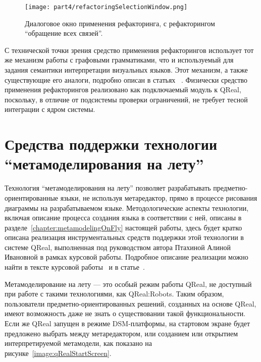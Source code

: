 \begin{figure} [ht]
	\begin{center}
		\texttt{[image: part4/refactoringSelectionWindow.png]}
		\caption{Диалоговое окно применения рефакторинга, с рефакторингом "`обращение всех связей"'.}
		\label{image:refactoringSelectionWindow}
	\end{center}
\end{figure}

С технической точки зрения средство применения рефакторингов использует тот же механизм 
работы с графовыми грамматиками, что и используемый для задания семантики интерпретации 
визуальных языков. Этот механизм, а также существующие его аналоги, подробно описан в статьях%
~\cite{polyakov2013interpreters, polyakov2013semantics, polyakov2012semantics, polyakov2012interpreter}.
Физически средство применения рефакторингов реализовано как подключаемый модуль к 
QReal, поскольку, в отличие от подсистемы проверки ограничений, не требует тесной 
интеграции с ядром системы.

\section{Средства поддержки технологии "`метамоделирования на лету"'}
Технология "`метамоделирования на лету"' позволяет разрабатывать предметно-ориентированные 
языки, не используя метаредактор, прямо в процессе рисования диаграммы на разрабатываемом 
языке. Методологические аспекты технологии, включая описание процесса создания языка 
в соответствии с ней, описаны в разделе~\ref{chapter:metamodelingOnFly} настоящей 
работы, здесь будет кратко описана реализация инструментальных средств поддержки этой 
технологии в системе QReal, выполненная под руководством автора Птахиной Алиной Ивановной 
в рамках курсовой работы. Подробное описание реализации можно найти в тексте курсовой работы~\cite{ptakhina2013course}
и в статье~\cite{ptakhina2013metamodeling}.

Метамоделирование на лету --- это особый режим работы QReal, не доступный при работе 
с такими технологиями, как QReal:Robots. Таким образом, пользователи предметно-ориентированных 
решений, созданных на основе QReal, имеют возможность даже не знать о существовании 
такой функциональности. Если же QReal запущен в режиме DSM-платформы, на стартовом 
экране будет предложено выбрать между метаредактором, или созданием или открытием 
интерпретируемой метамодели, как показано на рисунке~\ref{image:qRealStartScreen}.

